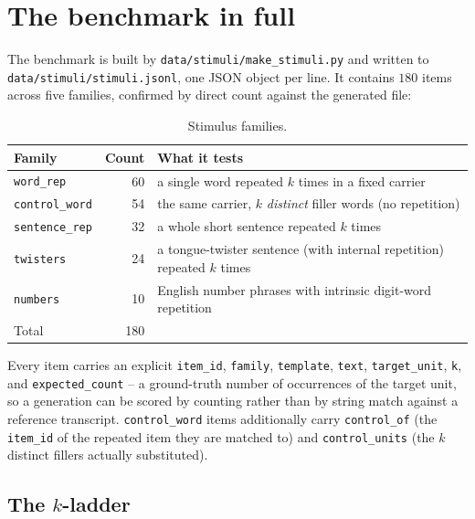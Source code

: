 \documentclass[11pt]{article}
\begin{document}
\section{The benchmark in full}
\label{sec:s3}

The benchmark is built by \texttt{data/stimuli/make\_stimuli.py} and written
to \texttt{data/stimuli/stimuli.jsonl}, one JSON object per line. It contains
$180$ items across five families, confirmed by direct count against the
generated file:

\begin{table}[h]
\centering
\caption{Stimulus families.}
\label{tab:families}
\begin{tabular}{lrl}
\toprule
Family & Count & What it tests \\
\midrule
\texttt{word\_rep} & 60 & a single word repeated $k$ times in a fixed carrier \\
\texttt{control\_word} & 54 & the same carrier, $k$ \emph{distinct} filler words (no repetition) \\
\texttt{sentence\_rep} & 32 & a whole short sentence repeated $k$ times \\
\texttt{twisters} & 24 & a tongue-twister sentence (with internal repetition) repeated $k$ times \\
\texttt{numbers} & 10 & English number phrases with intrinsic digit-word repetition \\
\midrule
Total & 180 & \\
\bottomrule
\end{tabular}
\end{table}

Every item carries an explicit \texttt{item\_id}, \texttt{family},
\texttt{template}, \texttt{text}, \texttt{target\_unit}, \texttt{k}, and
\texttt{expected\_count} -- a ground-truth number of occurrences of the target
unit, so a generation can be scored by counting rather than by string match
against a reference transcript. \texttt{control\_word} items additionally
carry \texttt{control\_of} (the \texttt{item\_id} of the repeated item they
are matched to) and \texttt{control\_units} (the $k$ distinct fillers actually
substituted).

\subsection{The $k$-ladder}
\end{document}
